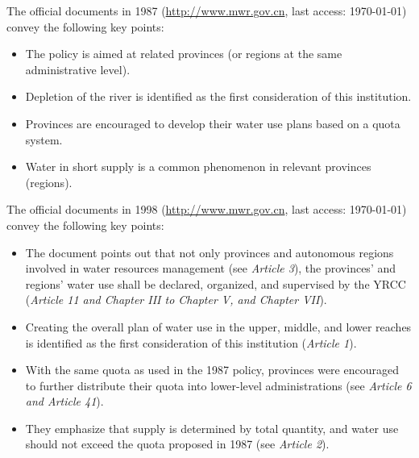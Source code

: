 
The official documents in 1987 (\href{http://www.gov.cn/zhengce/content/2011-03/30/content_3138.htm#}{http://www.mwr.gov.cn}, last access: \today) convey the following key points:

\begin{itemize}
	\item The policy is aimed at related provinces (or regions at the same administrative level).
	\item Depletion of the river is identified as the first consideration of this institution.
	\item Provinces are encouraged to develop their water use plans based on a quota system.
	\item Water in short supply is a common phenomenon in relevant provinces (regions).
\end{itemize}

The official documents in 1998
(\href{http://www.mwr.gov.cn/ztpd/2013ztbd/2013fxkh/fxkhswcbcs/cs/flfg/201304/t20130411_433489.html}{http://www.mwr.gov.cn}, last access: \today) convey the following key points:

\begin{itemize}
	\item The document points out that not only provinces and autonomous regions involved in water resources management (see \textit{Article 3}), the provinces’ and regions’ water use shall be declared, organized, and supervised by the YRCC (\textit{Article 11 and Chapter III to Chapter V, and Chapter VII}).
	\item Creating the overall plan of water use in the upper, middle, and lower reaches is identified as the first consideration of this institution (\textit{Article 1}).
	\item With the same quota as used in the 1987 policy, provinces were encouraged to further distribute their quota into lower-level administrations (see \textit{Article 6 and Article 41}).
	\item They emphasize that supply is determined by total quantity, and water use should not exceed the quota proposed in 1987 (see \textit{Article 2}).
\end{itemize}

